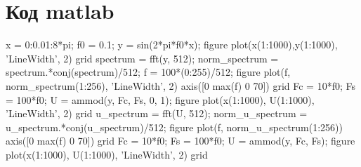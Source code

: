 \documentclass[10pt,a4paper]{report}
\begin{document}
\section{Код matlab}
\begin{flushleft}
x = 0:0.01:8*pi;\newline
f0 = 0.1;\newline
\newline
y = sin(2*pi*f0*x);\newline
figure\newline
plot(x(1:1000),y(1:1000), 'LineWidth', 2)\newline
grid\newline
\newline
spectrum = fft(y, 512);\newline
norm_spectrum = spectrum.*conj(spectrum)/512;\newline
f = 100*(0:255)/512;\newline
figure\newline
plot(f, norm_spectrum(1:256), 'LineWidth', 2)\newline
axis([0 max(f) 0 70])\newline
grid\newline
\newline
Fc = 10*f0;\newline
Fs = 100*f0;\newline
U = ammod(y, Fc, Fs, 0, 1);\newline
figure \newline
plot(x(1:1000), U(1:1000),  'LineWidth', 2)\newline
grid\newline
\newline
 u_spectrum = fft(U, 512);\newline
 norm_u_spectrum = u_spectrum.*conj(u_spectrum)/512;\newline
 figure\newline
 plot(f, norm_u_spectrum(1:256))\newline
 axis([0 max(f) 0 70])\newline
 grid\newline
\newline
Fc = 10*f0;\newline
Fs = 100*f0;\newline
U = ammod(y, Fc, Fs);\newline
figure \newline
plot(x(1:1000), U(1:1000), 'LineWidth', 2)\newline
grid\newline

\end{flushleft}
\end{document}
